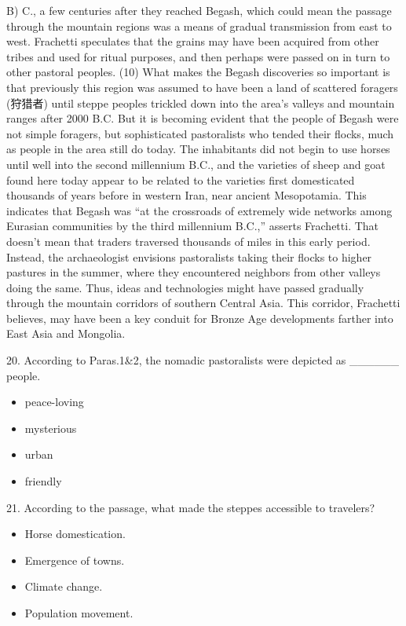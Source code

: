 \documentclass[UTF8,11pt]{ctexart}
\begin{document}
B) C., a few centuries after they reached Begash, which could mean the passage through the mountain regions was a means of gradual transmission from east to west. Frachetti speculates that the grains may have been acquired from other tribes and used for ritual purposes, and then perhaps were passed on in turn to other pastoral peoples. (10) What makes the Begash discoveries so important is that previously this region was assumed to have been a land of scattered foragers (狩猎者) until steppe peoples trickled down into the area’s valleys and mountain ranges after 2000 B.C. But it is becoming evident that the people of Begash were not simple foragers, but sophisticated pastoralists who tended their flocks, much as people in the area still do today. The inhabitants did not begin to use horses until well into the second millennium B.C., and the varieties of sheep and goat found here today appear to be related to the varieties first domesticated thousands of years before in western Iran, near ancient Mesopotamia. This indicates that Begash was “at the crossroads of extremely wide networks among Eurasian communities by the third millennium B.C.,” asserts Frachetti. That doesn’t mean that traders traversed thousands of miles in this early period. Instead, the archaeologist envisions pastoralists taking their flocks to higher pastures in the summer, where they encountered neighbors from other valleys doing the same. Thus, ideas and technologies might have passed gradually through the mountain corridors of southern Central Asia. This corridor, Frachetti believes, may have been a key conduit for Bronze Age developments farther into East Asia and Mongolia.


20. According to Paras.1\&2, the nomadic pastoralists were depicted as \_\_\_\_\_\_ people.


\begin{itemize}[leftmargin=2em,itemsep=.2em,topsep=.4em]\item[A.] peace-loving
\item[B.] mysterious
\item[C.] urban
\item[D.] friendly
\end{itemize}

21. According to the passage, what made the steppes accessible to travelers?


\begin{itemize}[leftmargin=2em,itemsep=.2em,topsep=.4em]\item[A.] Horse domestication.
\item[B.] Emergence of towns.
\item[C.] Climate change.
\item[D.] Population movement.
\end{itemize}
\end{document}
